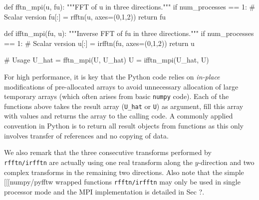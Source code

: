 \documentclass[11pt, oneside]{article}
\newcommand{\inpyth}{\lstinline[style=pythonstyle, basicstyle=\ttfamily]} %[]%
\begin{document}
\begin{python}
def fftn_mpi(u, fu):
    """FFT of u in three directions."""
    if num_processes == 1:                # Scalar version
        fu[:] = rfftn(u, axes=(0,1,2))
    return fu

def ifftn_mpi(fu, u):
    """Inverse FFT of fu in three directions."""
    if num_processes == 1:                # Scalar version
        u[:] = irfftn(fu, axes=(0,1,2))
    return u

# Usage
U_hat = fftn_mpi(U, U_hat)
U = ifftn_mpi(U_hat, U)
\end{python}
For high performance, it is key that the Python code relies on \emph{in-place}
modifications of pre-allocated arrays to avoid unnecessary allocation of
large temporary arrays (which often arises from basic \texttt{numpy} code).
Each of the functions above takes the result array (\texttt{U\_hat} or
\texttt{U}) as argument, fill this array with values and returns the
array to the calling code. A commonly applied convention in
Python is to return all result objects from functions as this only involves
transfer of references and no copying of data.

We also remark that the three consecutive transforms performed by \inpyth{rfftn/irfftn} are actually using one real transform along the $y$-direction and two complex transforms in the remaining two directions. Also note that the simple [[[numpy/pyfftw wrapped functions \inpyth{rfftn/irfftn} may only be used in single processor mode and the MPI implementation is detailed in Sec ?.
\end{document}
